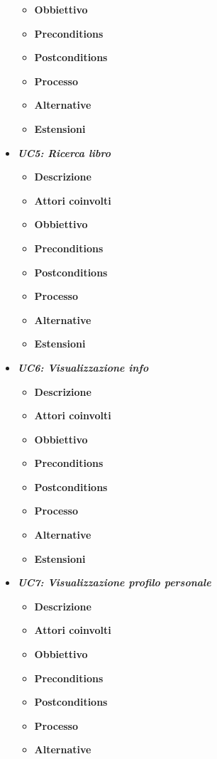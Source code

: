 \begin{itemize}
\begin{itemize}
		\item \textbf{Obbiettivo}
		\item \textbf{Preconditions}
		\item \textbf{Postconditions}
		\item \textbf{Processo}
		\item \textbf{Alternative}
		\item \textbf{Estensioni}
	\end{itemize}
	\item \textbf{\textit{UC5: Ricerca libro}}
	\begin{itemize}
		\item \textbf{Descrizione}
		\item \textbf{Attori coinvolti}
		\item \textbf{Obbiettivo}
		\item \textbf{Preconditions}
		\item \textbf{Postconditions}
		\item \textbf{Processo}
		\item \textbf{Alternative}
		\item \textbf{Estensioni}
	\end{itemize}
	\item \textbf{\textit{UC6: Visualizzazione info}}
	\begin{itemize}
		\item \textbf{Descrizione}
		\item \textbf{Attori coinvolti}
		\item \textbf{Obbiettivo}
		\item \textbf{Preconditions}
		\item \textbf{Postconditions}
		\item \textbf{Processo}
		\item \textbf{Alternative}
		\item \textbf{Estensioni}
	\end{itemize}
	\item \textbf{\textit{UC7: Visualizzazione profilo personale}}
	\begin{itemize}
		\item \textbf{Descrizione}
		\item \textbf{Attori coinvolti}
		\item \textbf{Obbiettivo}
		\item \textbf{Preconditions}
		\item \textbf{Postconditions}
		\item \textbf{Processo}
		\item \textbf{Alternative}

\end{itemize}
\end{itemize}
